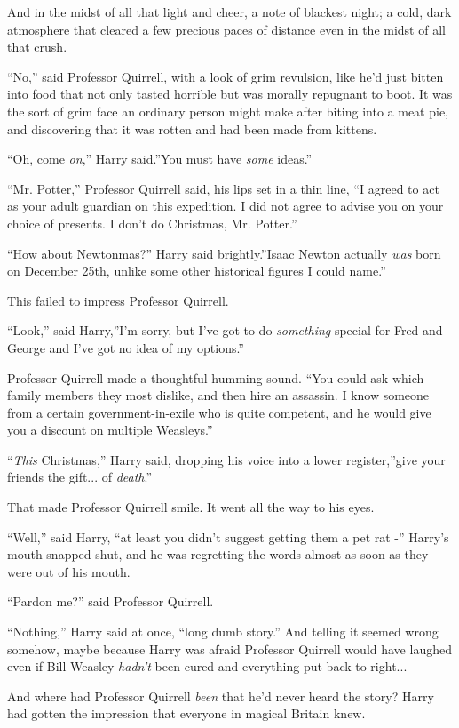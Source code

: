 And in the midst of all that light and cheer, a note of blackest night;
a cold, dark atmosphere that cleared a few precious paces of distance
even in the midst of all that crush.

``No,'' said Professor Quirrell, with a look of grim revulsion, like
he'd just bitten into food that not only tasted horrible but was morally
repugnant to boot. It was the sort of grim face an ordinary person might
make after biting into a meat pie, and discovering that it was rotten
and had been made from kittens.

``Oh, come \emph{on},'' Harry said.''You must have \emph{some} ideas.''

``Mr. Potter,'' Professor Quirrell said, his lips set in a thin line,
``I agreed to act as your adult guardian on this expedition. I did not
agree to advise you on your choice of presents. I don't do Christmas,
Mr. Potter.''

``How about Newtonmas?'' Harry said brightly.''Isaac Newton actually
\emph{was} born on December 25th, unlike some other historical figures I
could name.''

This failed to impress Professor Quirrell.

``Look,'' said Harry,''I'm sorry, but I've got to do \emph{something}
special for Fred and George and I've got no idea of my options.''

Professor Quirrell made a thoughtful humming sound. ``You could ask
which family members they most dislike, and then hire an assassin. I
know someone from a certain government-in-exile who is quite competent,
and he would give you a discount on multiple Weasleys.''

``\emph{This} Christmas,'' Harry said, dropping his voice into a lower
register,''give your friends the gift... of \emph{death}.''

That made Professor Quirrell smile. It went all the way to his eyes.

``Well,'' said Harry, ``at least you didn't suggest getting them a pet
rat -'' Harry's mouth snapped shut, and he was regretting the words
almost as soon as they were out of his mouth.

``Pardon me?'' said Professor Quirrell.

``Nothing,'' Harry said at once, ``long dumb story.'' And telling it
seemed wrong somehow, maybe because Harry was afraid Professor Quirrell
would have laughed even if Bill Weasley \emph{hadn't} been cured and
everything put back to right...

And where had Professor Quirrell \emph{been} that he'd never heard the
story? Harry had gotten the impression that everyone in magical Britain
knew.

